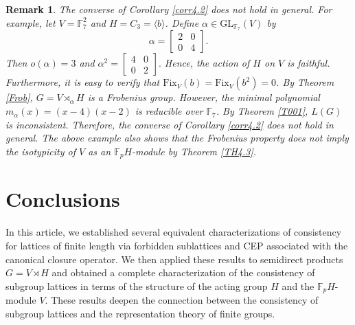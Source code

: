 \documentclass[12pt]{article}
\newtheorem{remark}{\bf Remark}[section]
\begin{document}
\begin{remark}\label{REmark}
\emph{The converse of Corollary \ref{corr4.2} does not hold in general. For example, let $V=\mathbb{F}^2_{7}$ and $H=C_3=\langle b\rangle$. 
Define $\alpha\in \mbox{GL}_{\mathbb{F}_{7}}(V)$ by
$$\alpha=\begin{bmatrix}
	    2 & 0 \\
	    0 & 4
	\end{bmatrix}.$$ 
Then $o(\alpha)=3$ and $\alpha^2=\begin{bmatrix}
	    4 & 0 \\
	    0 & 2
	\end{bmatrix}.$
Hence, the action of $H$ on $V$ is faithful. Furthermore, it is easy to verify that $\mbox{Fix}_V(b)=\mbox{Fix}_V(b^2)=0$. 
By Theorem \ref{Frob}, $G=V\rtimes_{\alpha} H$ is a Frobenius group. However, the minimal polynomial $m_{\alpha}(x)=(x-4)(x-2)$ is 
reducible over $\mathbb{F}_7$.
By Theorem \ref{T001}, $L(G)$ is inconsistent. Therefore, the converse of Corollary \ref{corr4.2} does not hold in general.
The above example also shows that the Frobenius property does not imply the isotypicity of $V$ as an $\mathbb{F}_pH$-module by Theorem \ref{TH4.3}.}
\end{remark}

\section{Conclusions}
In this article, we established several equivalent characterizations of consistency 
for lattices of finite length via forbidden sublattices 
and CEP associated with the canonical 
closure operator. We then applied these results to semidirect products 
$G=V\rtimes H$ and obtained a complete characterization of the consistency 
of subgroup lattices in terms of the structure of the acting group $H$ 
and the $\mathbb{F}_pH$-module $V$. These results deepen the connection 
between the consistency of subgroup lattices and the representation 
theory of finite groups.
\end{document}
